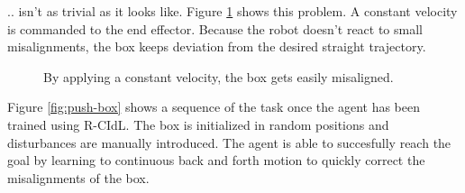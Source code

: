 .. isn't as trivial as it looks like. Figure \ref{fig:planar-motion-problem} shows this problem. A constant velocity is commanded to the end effector. Because the robot doesn't react to small misalignments, the box keeps deviation from the  desired straight trajectory.


 \begin{figure}[H]
  \centering
  \hspace*{\fill}%
   \hfill
   \hfill
   \hspace*{\fill}%
  \caption{By applying a constant velocity, the box gets easily misaligned.}
  \label{fig:planar-motion-problem}
\end{figure}

Figure \ref{fig:push-box} shows a sequence of the task once the agent has been trained using R-CIdL. The box is initialized in random positions and disturbances are manually introduced. The agent is able to succesfully reach the goal by learning to continuous back and forth motion to quickly correct the misalignments of the box.

